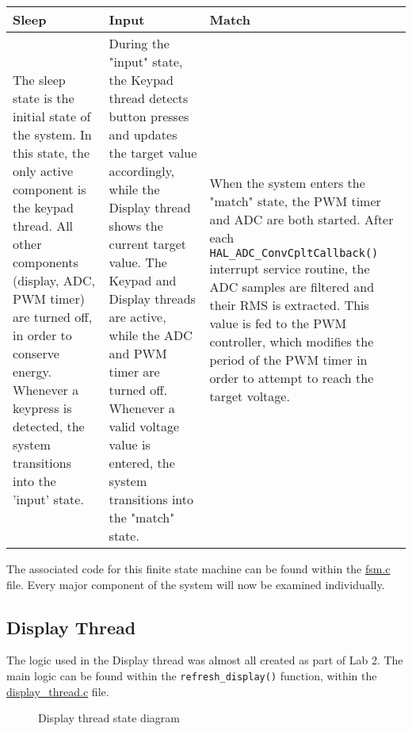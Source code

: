 \begin{tabular}{ p{5cm} | p{5cm} | p{5cm}}
Sleep & Input & Match \\
\hline
The sleep state is the initial state of the system. In this state, the only active component is the keypad thread. All other components (display, ADC, PWM timer) are turned off, in order to conserve energy. Whenever a keypress is detected, the system transitions into the 'input' state.
&
During the "input" state, the Keypad thread detects button presses and updates the target value accordingly, while the Display thread shows the current target value. The Keypad and Display threads are active, while the ADC and PWM timer are turned off. Whenever a valid voltage value is entered, the system transitions into the "match" state.
&
When the system enters the "match" state, the PWM timer and ADC are both started. After each \verb|HAL_ADC_ConvCpltCallback()| interrupt service routine, the ADC samples are filtered and their RMS is extracted. This value is fed to the PWM controller, which modifies the period of the PWM timer in order to attempt to reach the target voltage.
\\
\end{tabular}


The associated code for this finite state machine can be found within the \href{https://github.com/lebrice/MicroP/blob/master/Lab4/Src/fsm.c}{fsm.c} file. Every major component of the system will now be examined individually.


\subsection{Display Thread}

\def \DISPLAYREFRESHINTERVAL {8ms}

The logic used in the Display thread was almost all created as part of Lab 2. The main logic can be found within the \verb|refresh_display()| function, within the \href{https://github.com/lebrice/MicroP/blob/master/Lab4/Src/display_thread.c}{display\_thread.c} file.



\begin{figure}[h]
\centering

\caption{Display thread state diagram}
\label{fig:display_state_diagram}
\end{figure}


